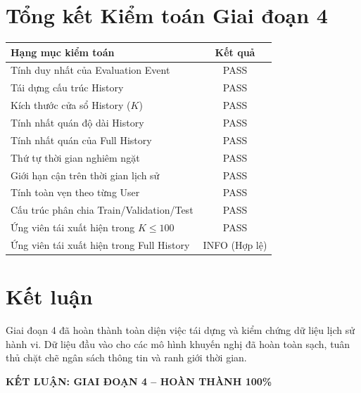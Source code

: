 \documentclass[12pt,a4paper]{article}
\begin{document}
\section{Tổng kết Kiểm toán Giai đoạn 4}
\begin{center}
\begin{tabular}{p{9cm}c}
\toprule
\textbf{Hạng mục kiểm toán} & \textbf{Kết quả} \\
\midrule
Tính duy nhất của Evaluation Event & PASS \\
Tái dựng cấu trúc History & PASS \\
Kích thước cửa sổ History ($K$) & PASS \\
Tính nhất quán độ dài History & PASS \\
Tính nhất quán của Full History & PASS \\
Thứ tự thời gian nghiêm ngặt & PASS \\
Giới hạn cận trên thời gian lịch sử & PASS \\
Tính toàn vẹn theo từng User & PASS \\
Cấu trúc phân chia Train/Validation/Test & PASS \\
Ứng viên tái xuất hiện trong $K \le 100$ & PASS \\
Ứng viên tái xuất hiện trong Full History & INFO (Hợp lệ) \\
\bottomrule
\end{tabular}
\end{center}

\section{Kết luận}
Giai đoạn 4 đã hoàn thành toàn diện việc tái dựng và kiểm chứng dữ liệu lịch sử hành vi. Dữ liệu đầu vào cho các mô hình khuyến nghị đã hoàn toàn sạch, tuân thủ chặt chẽ ngân sách thông tin và ranh giới thời gian.

\vspace{10pt}
\begin{center}
\large\textbf{KẾT LUẬN: GIAI ĐOẠN 4 -- HOÀN THÀNH 100\%}
\end{center}
\end{document}
